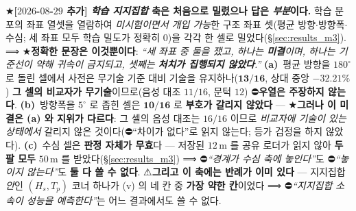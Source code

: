\documentclass[11pt]{report}
\numberwithin{equation}{chapter}
\numberwithin{figure}{chapter}
\numberwithin{table}{chapter}
\begin{document}
★\textbf{[$2026$-$08$-$29$ 추가] \emph{학습 지지집합} 축은 처음으로 밀렸으나 답은
\emph{부분}이다.} 학습 분포의 좌표 열셋을 열람하여 \emph{미시험이면서 개입 가능}한 구조
좌표 셋(평균 방향$\cdot$방향폭$\cdot$수심; 세 좌표 모두 학습 밀도가 정확히 $0$)을 각각
한 셀로 밀었다(\S\ref{sec:results_m3}). ⟹ ★\textbf{정확한 문장은 이것뿐이다}:
\emph{``세 좌표 중 둘을 쟀고, 하나는 \textbf{미결}이며, 하나는 기준선이 약해 귀속이
금지되고, 셋째는 \textbf{처치가 집행되지 않았다}.''}
\textbf{(a)}~평균 방향을 $180^\circ$ 로 돌린 셀에서 사전은 무기술 기준 대비 기술을
유지하나($\mathbf{13/16}$, 상대 중앙 $\mathbf{-32.21\%}$) \textbf{그 셀의 비교자가
무기술}이므로(음성 대조 $11/16$, 문턱 $12$) ⛔\textbf{우열은 주장하지 않는다}.
\textbf{(b)}~방향폭을 $5^\circ$ 로 좁힌 셀은 $\mathbf{10/16}$ 로 \textbf{부호가 갈리지
않았다} --- ★\textbf{그러나 이 미결은 (a) 와 지위가 다르다}: 그 셀의 음성 대조는
$16/16$ 이므로 \emph{비교자에 기술이 있는 상태에서} 갈리지 않은 것이다(⛔``차이가 없다''로
읽지 않는다; 등가 검정을 하지 않았다).
\textbf{(c)}~수심 셀은 \textbf{판정 자체가 무효}다 --- 저장된 $12$\,m 를 공유 로더가 읽지
않아 \textbf{두 팔 모두} $50$\,m 를 받았다(\S\ref{sec:results_m3}) ⟹
⛔\emph{``경계가 수심 축에 놓인다''}도 ⛔\emph{``놓이지 않는다''}도 \textbf{둘 다 쓸 수 없다}.
⚠\textbf{그리고 이 축에는 반례가 이미 있다} --- 지지집합 \emph{안}인 $(H_s, T_p)$ 코너 하나가
(v) 의 네 칸 중 \textbf{가장 약한 칸}이었다 ⟹ ⛔\emph{``지지집합 소속이 성능을 예측한다''}는
어느 결과에서도 쓸 수 없다.
\end{document}
